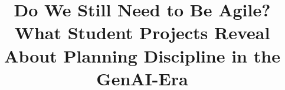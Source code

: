 \documentclass[conference]{IEEEtran}
\title{Do We Still Need to Be Agile? What Student Projects Reveal About Planning Discipline in the GenAI-Era}
\author{\IEEEauthorblockN{Anonymous Authors}}
\begin{document}
\maketitle
\raggedbottom










\nocite{*}


\end{document}
